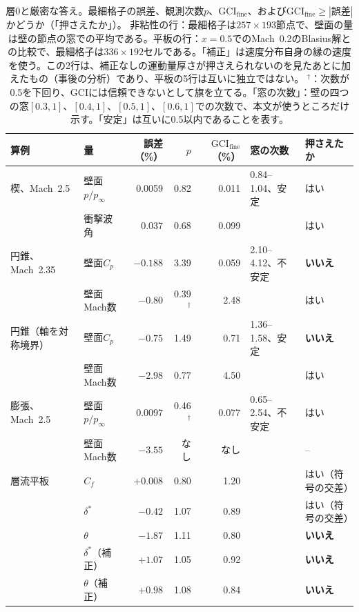 \documentclass[twocolumn]{labreport}
\newcommand{\Cp}{C_p}
\newcommand{\pinf}{p_\infty}
\newcommand{\fine}{\mathrm{fine}}
\newcommand{\tick}{はい}
\newcommand{\cross}{\textbf{いいえ}}
\begin{document}
\begin{table}[t]
\centering
\caption{層0と厳密な答え。最細格子の誤差、観測次数$p$、$\mathrm{GCI}_\fine$、および$\mathrm{GCI}_\fine\ge|\text{誤差}|$かどうか（「押さえたか」）。
非粘性の行：最細格子は$257\times193$節点で、壁面の量は壁の節点の窓での平均である。平板の行：$x=0.5$でのMach~0.2のBlasius解との比較で、最細格子は$336\times192$セルである。「補正」は速度分布自身の縁の速度を使う。この2行は、補正なしの運動量厚さが押さえられないのを見たあとに加えたもの（事後の分析）であり、平板の5行は互いに独立ではない。
$^\dagger$：次数が0.5を下回り、GCIには信頼できないとして旗を立てる。「窓の次数」：壁の四つの窓$[0.3,1]$、$[0.4,1]$、$[0.5,1]$、$[0.6,1]$での次数で、本文が使うところだけ示す。「安定」は互いに0.5以内であることを表す。}
\label{tab:l0}
\begin{tabular}{@{}llrrrll@{}}
\toprule
算例 & 量 & 誤差（\%） & $p$ & $\mathrm{GCI}_\fine$（\%） & 窓の次数 & 押さえたか \\
\midrule
楔、Mach~2.5 & 壁面$p/\pinf$ & 0.0059 & 0.82 & 0.011 & 0.84--1.04、安定 & \tick \\
 & 衝撃波角 & 0.037 & 0.68 & 0.099 & & \tick \\
円錐、Mach~2.35 & 壁面$\Cp$ & $-0.188$ & 3.39 & 0.059 & 2.10--4.12、不安定 & \cross \\
 & 壁面Mach数 & $-0.80$ & 0.39$^\dagger$ & 2.48 & & \tick \\
円錐（軸を対称境界） & 壁面$\Cp$ & $-0.75$ & 1.49 & 0.71 & 1.36--1.58、安定 & \cross \\
 & 壁面Mach数 & $-2.98$ & 0.77 & 4.50 & & \tick \\
膨張、Mach~2.5 & 壁面$p/\pinf$ & 0.0097 & 0.46$^\dagger$ & 0.077 & 0.65--2.54、不安定 & \tick \\
 & 壁面Mach数 & $-3.55$ & なし & なし & & -- \\
\midrule
層流平板 & $C_f$ & $+0.008$ & 0.80 & 1.20 & & \tick（符号の交差） \\
 & $\delta^*$ & $-0.42$ & 1.07 & 0.89 & & \tick（符号の交差） \\
 & $\theta$ & $-1.87$ & 1.11 & 0.80 & & \cross \\
 & $\delta^*$（補正） & $+1.07$ & 1.05 & 0.92 & & \cross \\
 & $\theta$（補正） & $+0.98$ & 1.08 & 0.84 & & \cross \\
\bottomrule
\end{tabular}
\end{table}
\end{document}
